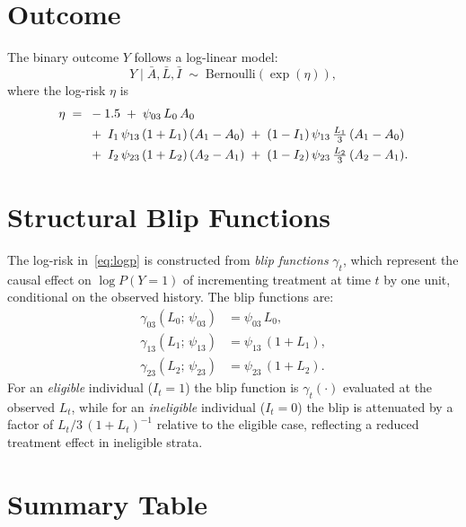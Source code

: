 \documentclass[12pt]{article}
\begin{document}
\section{Outcome}

The binary outcome $Y$ follows a log-linear model:
\[
  Y \mid \bar{A}, \bar{L}, \bar{I}
  \;\sim\;
  \mathrm{Bernoulli}\!\left(\exp(\eta)\right),
\]
where the log-risk $\eta$ is
\begin{align}
  \eta \;=\; {}&
  -1.5
  \;+\; \psi_{03}\, L_0\, A_0 \notag \\
  &+\; I_1\, \psi_{13}\,(1 + L_1)\,(A_1 - A_0)
   \;+\; (1-I_1)\, \psi_{13}\, \tfrac{L_1}{3}\,(A_1 - A_0) \notag \\
  &+\; I_2\, \psi_{23}\,(1 + L_2)\,(A_2 - A_1)
   \;+\; (1-I_2)\, \psi_{23}\, \tfrac{L_2}{3}\,(A_2 - A_1). \label{eq:logp}
\end{align}

\section{Structural Blip Functions}

The log-risk in~\eqref{eq:logp} is constructed from \emph{blip functions}
$\gamma_t$, which represent the causal effect on $\log P(Y=1)$ of
incrementing treatment at time $t$ by one unit, conditional on the
observed history.  The blip functions are:
\begin{align}
  \gamma_{03}(L_0;\, \psi_{03}) &= \psi_{03}\, L_0, \\
  \gamma_{13}(L_1;\, \psi_{13}) &= \psi_{13}\,(1 + L_1), \\
  \gamma_{23}(L_2;\, \psi_{23}) &= \psi_{23}\,(1 + L_2).
\end{align}
For an \emph{eligible} individual ($I_t = 1$) the blip function is
$\gamma_t(\cdot)$ evaluated at the observed $L_t$, while for an
\emph{ineligible} individual ($I_t = 0$) the blip is attenuated by a
factor of $L_t/3\,(1+L_t)^{-1}$ relative to the eligible case, reflecting a
reduced treatment effect in ineligible strata.

\section{Summary Table}
\end{document}
